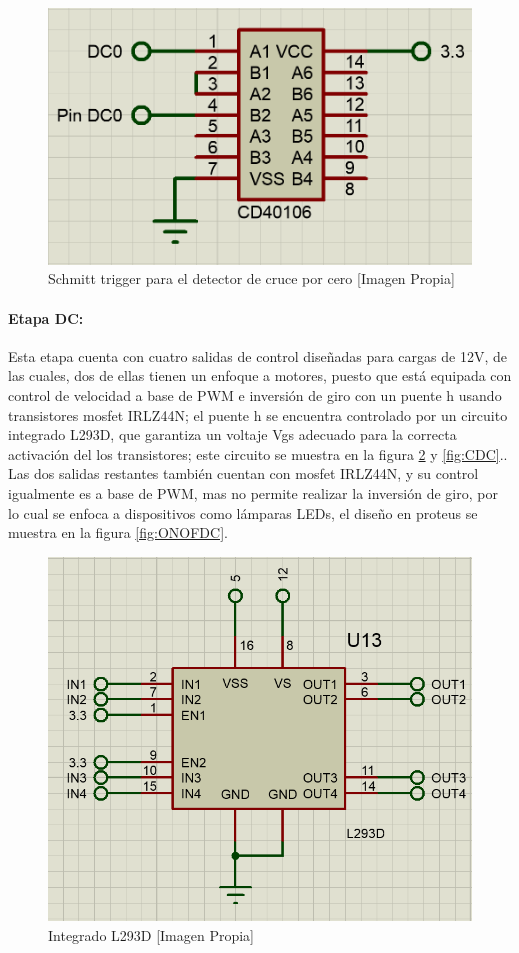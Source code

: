 		\begin{figure}[H]
			\centering
			\caption{Schmitt trigger para el detector de cruce por cero [Imagen Propia]}
			\label{fig:DC02}
			\includegraphics[width=0.5\linewidth]{Imagenes/DC02}
		\end{figure}
	
	\paragraph{Etapa DC:}
		Esta etapa cuenta con cuatro salidas de control diseñadas para cargas de 12V, de las cuales, dos de ellas tienen un enfoque a motores, puesto que está equipada con control de velocidad a base de PWM e inversión de giro con un puente h usando transistores mosfet IRLZ44N; el puente h se encuentra controlado por un circuito integrado L293D, que garantiza un voltaje Vgs adecuado para la correcta activación del los transistores; este circuito se muestra en la figura \ref{fig:L293D} y \ref{fig:CDC}.\cite{IRL}.\\
		
		Las dos salidas restantes también cuentan con mosfet IRLZ44N, y su control igualmente es a base de PWM, mas no permite realizar la inversión de giro, por lo cual se enfoca a dispositivos como lámparas LEDs, el diseño en proteus se muestra en la figura \ref{fig:ONOFDC}.\\
		
		\begin{figure}[H]
			\centering
			\caption{Integrado L293D [Imagen Propia]}
			\label{fig:L293D}
			\includegraphics[width=0.5\linewidth]{Imagenes/L293D}
		\end{figure}
		
